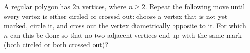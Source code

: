 A regular polygon has $2n$ vertices, where $n\ge2$. Repeat the following move until every vertex is either circled or crossed out: choose a vertex that is not yet marked, circle it, and cross out the vertex diametrically opposite to it. For which $n$ can this be done so that no two adjacent vertices end up with the same mark (both circled or both crossed out)?
